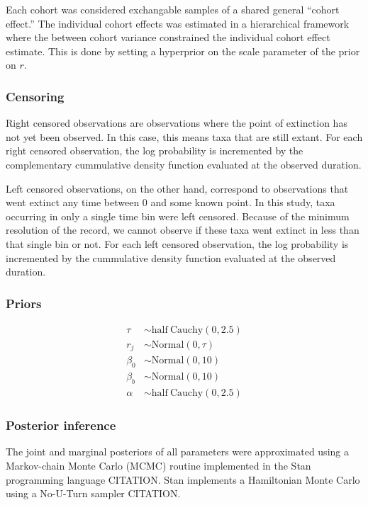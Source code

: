 \documentclass[12pt,letterpaper]{article}
\begin{document}
Each cohort was considered exchangable samples of a shared general ``cohort effect.'' The individual cohort effects was estimated in a hierarchical framework where the between cohort variance constrained the individual cohort effect estimate. This is done by setting a hyperprior on the scale parameter of the prior on \(r\).



\subsubsection{Censoring}


Right censored observations are observations where the point of extinction has not yet been observed. In this case, this means taxa that are still extant. For each right censored observation, the log probability is incremented by the complementary cummulative density function evaluated at the observed duration.

Left censored observations, on the other hand, correspond to observations that went extinct any time between 0 and some known point. In this study, taxa occurring in only a single time bin were left censored. Because of the minimum resolution of the record, we cannot observe if these taxa went extinct in less than that single bin or not. For each left censored observation, the log probability is incremented by the cummulative density function evaluated at the observed duration.


\subsubsection{Priors}

\begin{align*}
  \tau &\sim \mathrm{half\ Cauchy}(0, 2.5) \\
  r_{j} &\sim \mathrm{Normal}(0, \tau) \\
  \beta_{0} &\sim \mathrm{Normal}(0, 10) \\
  \beta_{b} &\sim \mathrm{Normal}(0, 10) \\
  \alpha &\sim \mathrm{half\ Cauchy}(0, 2.5)
\end{align*}


\subsubsection{Posterior inference}

The joint and marginal posteriors of all parameters were approximated using a Markov-chain Monte Carlo (MCMC) routine implemented in the Stan programming language CITATION. Stan implements a Hamiltonian Monte Carlo using a No-U-Turn sampler CITATION. 
\end{document}
